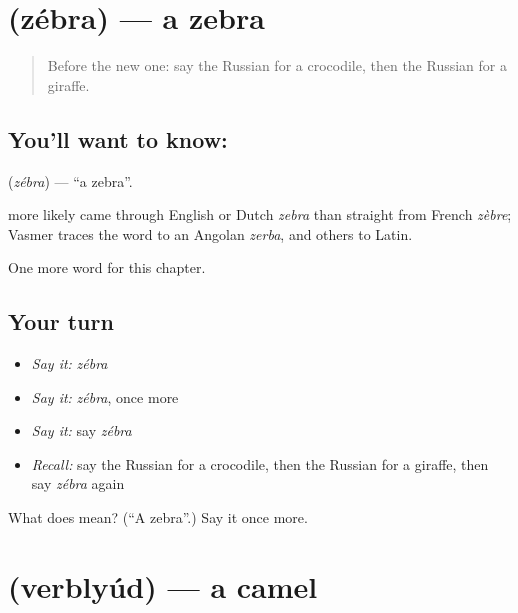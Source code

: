 \section[\texorpdfstring{\ru{зебра} (zébra)}{зебра (zébra)}]{ (zébra) — a zebra}

\label{lesson:RU-C225-zebra}



\begin{quote}
Before the new one: say the Russian for a crocodile, then the Russian for a giraffe.
\end{quote}

\subsection*{You'll want to know: }
\textbf{} (\emph{zébra}) — \textquotedblleft{}a zebra\textquotedblright{}.

\begin{cousinweb}
\textbf{} more likely came through English or Dutch \emph{zebra} than straight from French \emph{zèbre}; Vasmer traces the word to an Angolan \emph{zerba}, and others to Latin.
\end{cousinweb}

\begin{grammarlens}[title={What you've built}]
One more word for this chapter.
\end{grammarlens}

\subsection*{Your turn}
\begin{itemize}
\raggedright
  \item \emph{Say it:} \emph{zébra}
  \item \emph{Say it:} \emph{zébra}, once more
  \item \emph{Say it:} say \emph{zébra}
  \item \emph{Recall:} say the Russian for a crocodile, then the Russian for a giraffe, then say \emph{zébra} again
\end{itemize}

\begin{tcolorbox}[breakable,colback=teal!4,colframe=teal!35!black,title={Before you move on}]
What does  mean? (\textquotedblleft{}A zebra\textquotedblright{}.) Say it once more.
\end{tcolorbox}
\section[\texorpdfstring{\ru{верблюд} (verblyúd)}{верблюд (verblyúd)}]{ (verblyúd) — a camel}

